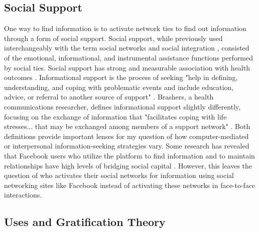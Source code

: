 \subsection{Social Support}

One way to find information is to activate network ties to find out information
through a form of social support. Social support, while previously used
interchangeably with the term social networks and social integration
\citep{houseStructuresProcessesSocial1988}, consisted of the emotional,
informational, and instrumental assistance functions performed by social ties.
Social support has strong and measurable association with health outcomes
\citep{houseMeasuresConceptsSocial1985, thoitsMechanismsLinkingSocial2011}.
Informational support is the process of seeking "help in defining,
understanding, and coping with problematic events and include education, advice,
or referral to another source of support" \citep[p. 640]{winemiller_etal93}.
Brashers, a health communications researcher, defines informational support
slightly differently, focusing on the exchange of information that "facilitates
coping with life stresses... that may be exchanged among members of a support
network" \citeyearpar[p. 260]{brashersInformationSeekingAvoiding2002}. Both
definitions provide important lenses for my question of how computer-mediated or
interpersonal information-seeking strategies vary. Some research has revealed
that Facebook users who utilize the platform to find information and to maintain
relationships have high levels of bridging social capital \citep{liu2016meta}.
However, this leaves the question of who activates their social networks for
information using social networking sites like Facebook instead of activating
these networks in face-to-face interactions.


\subsection{Uses and Gratification Theory}

